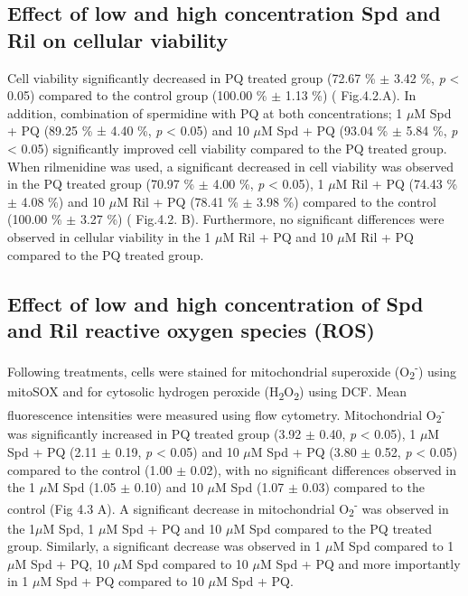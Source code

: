 \subsection{Effect of low and high concentration Spd and Ril on cellular viability} 
Cell viability significantly decreased in PQ treated group (72.67 \% $\pm$ 3.42 \%, \textit{p} < 0.05) compared to the control group (100.00 \% $\pm$ 1.13 \%) ( Fig.4.2.A). In addition, combination of spermidine with PQ at both concentrations; 1 $\mu$M Spd + PQ (89.25 \% ± 4.40 \%, \textit{p} < 0.05) and 10 $\mu$M Spd + PQ (93.04 \% $\pm$ 5.84 \%, \textit{p} < 0.05) significantly improved cell viability compared to the PQ treated group. When rilmenidine was used, a significant decreased in cell viability was observed in the PQ treated group (70.97 \% $\pm$ 4.00 \%, \textit{p} < 0.05), 1 $\mu$M Ril + PQ (74.43 \% $\pm$ 4.08 \%) and 10 $\mu$M Ril + PQ (78.41 \% $\pm$ 3.98 \%) compared to the control (100.00 \% $\pm$ 3.27 \%) ( Fig.4.2. B). Furthermore, no significant differences were observed in cellular viability in the 1 $\mu$M Ril + PQ and 10 $\mu$M Ril + PQ compared to the PQ treated group.

\subsection{Effect of low and high concentration of Spd and Ril reactive oxygen species (ROS)}
Following treatments, cells were stained for mitochondrial superoxide (O\textsubscript{2}\textsuperscript{-}) using mitoSOX and for cytosolic hydrogen peroxide (H\textsubscript{2}O\textsubscript{2}) using DCF. Mean fluorescence intensities were measured using flow cytometry. Mitochondrial O\textsubscript{2}\textsuperscript{-} was significantly increased in PQ treated group (3.92 $\pm$ 0.40, \textit{p} < 0.05), 1 $\mu$M Spd + PQ (2.11 $\pm$ 0.19, \textit{p} < 0.05) and 10 $\mu$M Spd + PQ (3.80 $\pm$ 0.52, \textit{p} < 0.05) compared to the control (1.00 $\pm$ 0.02), with no significant differences observed in the 1 $\mu$M Spd (1.05 $\pm$ 0.10) and 10 $\mu$M Spd (1.07 $\pm$ 0.03) compared to the control (Fig 4.3 A). A significant decrease in mitochondrial O\textsubscript{2}\textsuperscript{-} was observed in the 1$\mu$M Spd, 1 $\mu$M Spd + PQ and 10 $\mu$M Spd compared to the PQ treated group. Similarly, a significant decrease was observed in 1 $\mu$M Spd compared to 1 $\mu$M Spd + PQ, 10 $\mu$M Spd compared to 10 $\mu$M Spd + PQ and more importantly in 1 $\mu$M Spd + PQ compared to 10 $\mu$M Spd + PQ. 

